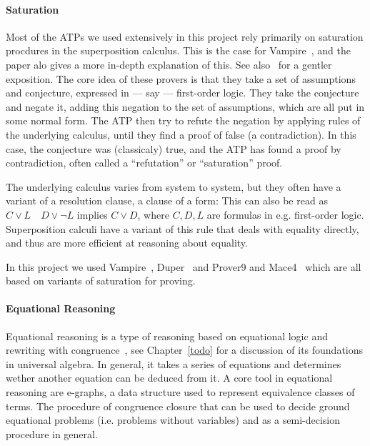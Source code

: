 \paragraph{Saturation}
Most of the ATPs we used extensively in this project rely primarily on saturation procdures in the superposition calculus.
This is the case for Vampire~\cite{DBLP:conf/cav/KovacsV13}, and the paper alo gives a more in-depth explanation of this.
See also~\cite{DBLP:journals/cacm/BentkampBNTVW23} for a gentler exposition.
The core idea of these provers is that they take a set of assumptions and conjecture, expressed in --- say --- first-order logic.
They take the conjecture and negate it, adding this negation to the set of assumptions, which are all put in some normal form.
The ATP then try to refute the negation by applying rules of the underlying calculus, until they find a proof of false (a contradiction).
In this case, the conjecture was (classicaly) true, and the ATP has found a proof by contradiction, often called a ``refutation'' or ``saturation'' proof.

The underlying calculus varies from system to system, but they often have a variant of a resolution clause, a clause of a form:
This can also be read as $C \lor L \quad D \lor \neg L$ implies $C \lor D$, where $C, D, L$ are formulas in e.g. first-order logic.
Superposition calculi have a variant of this rule that deals with equality directly, and thus are more efficient at reasoning about equality.

In this project we used Vampire~\cite{DBLP:conf/cav/KovacsV13}, Duper~\cite{DBLP:conf/itp/CluneQBA24} and Prover9 and Mace4~\cite{prover9-mace4} which are all based on variants of saturation for proving.

\paragraph{Equational Reasoning}

Equational reasoning is a type of reasoning based on equational logic and rewriting with congruence~\cite{term-rewriting}, see Chapter~\ref{todo} for a discussion of its foundations in universal algebra.
In general, it takes a series of equations and determines wether another equation can be deduced from it.
A core tool in equational reasoning are e-graphs, a data structure used to represent equivalence classes of terms.
The procedure of congruence closure that can be used to decide ground equational problems (i.e. problems without variables) and as a semi-decision procedure in general.

